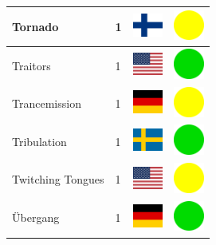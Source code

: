 \documentclass[12pt, a4paper, twoside]{report}
\begin{document}
\begin{center}
\begin{longtable}{|p{5cm}|p{2cm}|p{2cm}|p{2cm}|}
			Tornado & 1 & \includegraphics[width=1cm]{4x3/fi} & \includegraphics[width=1cm]{likes/m} \\ \hline
			Traitors & 1 & \includegraphics[width=1cm]{4x3/us} & \includegraphics[width=1cm]{likes/y} \\ \hline
			Trancemission & 1 & \includegraphics[width=1cm]{4x3/de} & \includegraphics[width=1cm]{likes/m} \\ \hline
			Tribulation & 1 & \includegraphics[width=1cm]{4x3/se} & \includegraphics[width=1cm]{likes/y} \\ \hline
			Twitching Tongues & 1 & \includegraphics[width=1cm]{4x3/us} & \includegraphics[width=1cm]{likes/m} \\ \hline
			Übergang & 1 & \includegraphics[width=1cm]{4x3/de} & \includegraphics[width=1cm]{likes/y} \\ \hline

\end{longtable}
\end{center}
\end{document}
